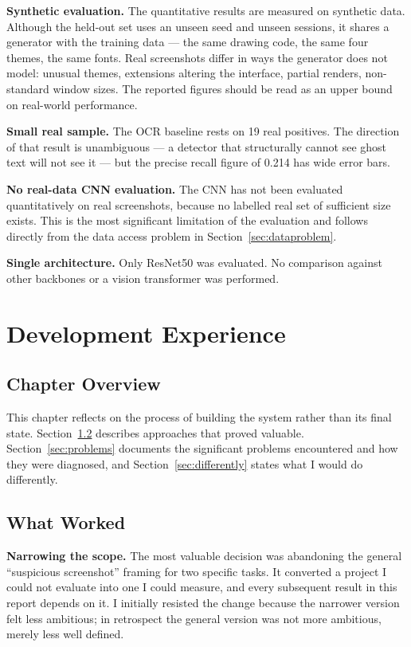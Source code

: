 \documentclass[12pt,oneside]{report}
\begin{document}
\textbf{Synthetic evaluation.} The quantitative results are measured on
synthetic data. Although the held-out set uses an unseen seed and unseen
sessions, it shares a generator with the training data --- the same drawing
code, the same four themes, the same fonts. Real screenshots differ in ways the
generator does not model: unusual themes, extensions altering the interface,
partial renders, non-standard window sizes. The reported figures should be read
as an upper bound on real-world performance.

\textbf{Small real sample.} The OCR baseline rests on 19 real positives. The
direction of that result is unambiguous --- a detector that structurally cannot
see ghost text will not see it --- but the precise recall figure of 0.214 has
wide error bars.

\textbf{No real-data CNN evaluation.} The CNN has not been evaluated
quantitatively on real screenshots, because no labelled real set of sufficient
size exists. This is the most significant limitation of the evaluation and
follows directly from the data access problem in
Section~\ref{sec:dataproblem}.

\textbf{Single architecture.} Only ResNet50 was evaluated. No comparison
against other backbones or a vision transformer was performed.

\chapter{Development Experience}
\label{ch:experience}

\section{Chapter Overview}

This chapter reflects on the process of building the system rather than its
final state. Section~\ref{sec:whatworked} describes approaches that proved
valuable. Section~\ref{sec:problems} documents the significant problems
encountered and how they were diagnosed, and Section~\ref{sec:differently}
states what I would do differently.

\section{What Worked}
\label{sec:whatworked}

\textbf{Narrowing the scope.} The most valuable decision was abandoning the
general ``suspicious screenshot'' framing for two specific tasks. It converted
a project I could not evaluate into one I could measure, and every subsequent
result in this report depends on it. I initially resisted the change because
the narrower version felt less ambitious; in retrospect the general version was
not more ambitious, merely less well defined.
\end{document}

